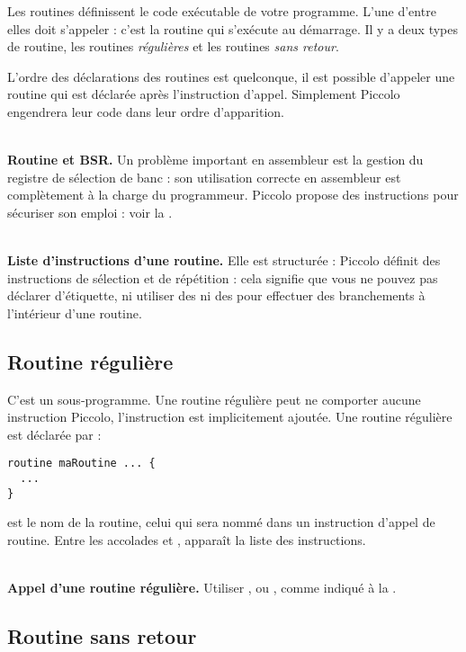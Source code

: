 
Les routines définissent le code exécutable de votre programme. L’une d’entre elles doit s’appeler  : c’est la routine qui s’exécute au démarrage. Il y a deux types de routine, les routines \emph{régulières} et les routines \emph{sans retour}.


L’ordre des déclarations des routines est quelconque, il est possible d’appeler une routine qui est déclarée après l’instruction d’appel. Simplement Piccolo engendrera leur code dans leur ordre d’apparition. 

~\\
\textbf{Routine et BSR.} Un problème important en assembleur est la gestion du registre de sélection de banc  : son utilisation correcte en assembleur est complètement à la charge du programmeur. Piccolo propose des instructions pour sécuriser son emploi : voir la .

~\\
\textbf{Liste d’instructions d’une routine.} Elle est structurée : Piccolo définit des instructions de sélection et de répétition : cela signifie que vous ne pouvez pas déclarer d’étiquette, ni utiliser des  ni des  pour effectuer des branchements à l’intérieur d’une routine.


\subsection{Routine régulière}

C'est un sous-programme. Une routine régulière peut ne comporter aucune instruction Piccolo, l'instruction  est implicitement ajoutée. Une routine régulière est déclarée par :
\begin{lstlisting}[language=piccolo]
routine maRoutine ... {
  ...
}
\end{lstlisting}

 est le nom de la routine, celui qui sera nommé dans un instruction d’appel de routine. Entre les accolades \piccolo{\{} et \piccolo{\}}, apparaît la liste des instructions.

~\\
\textbf{Appel d’une routine régulière.} Utiliser ,  ou , comme indiqué à la .

\subsection{Routine sans retour}

